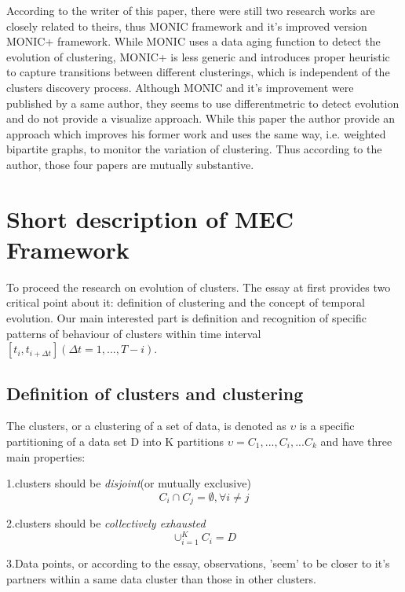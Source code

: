 \documentclass{sig-alternate-05-2015}
\begin{document}
According to the writer of this paper, there were still two research works are closely related to theirs, thus MONIC framework\cite{SPILIOPOULOU:transition} and it's improved version MONIC+ framework\cite{SPILIOPOULOU:tracing}. While MONIC uses a data aging function to detect the evolution of clustering, MONIC+ is less generic and introduces proper heuristic to capture transitions between different clusterings, which is independent of the clusters discovery process. Although MONIC and it's improvement were published by a same author, they seems to use differentmetric to detect evolution and do not provide a visualize approach. While this paper the author provide an approach which improves his former work\cite{OLIVEIRA:bipartite} and uses the same way, i.e. weighted bipartite graphs, to monitor the variation of clustering. Thus according to the author, those four papers are mutually substantive.

\section{Short description of MEC Framework}
To proceed the research on evolution of clusters. The essay at first provides two critical point about it: definition of clustering and the concept of temporal evolution. Our main interested part is definition and recognition of specific patterns of behaviour of clusters within time interval $[t_i, t_{i+\Delta t}] (\Delta t = 1,...,T-i)$.
\subsection{Definition of clusters and clustering}
The clusters, or a clustering of a set of data, is denoted as $\upsilon$ is a specific partitioning of a data set D into K partitions $\upsilon = {C_1,...,C_i,...C_k}$ and have three main properties:

    1.clusters should be \emph{disjoint}(or mutually exclusive)
        \begin{displaymath}
          C_i\cap C_j = \emptyset, \forall i\ne j
        \end{displaymath}

    2.clusters should be \emph{collectively exhausted}
        \begin{displaymath}
          \cup^K_{i=1}C_i=D
        \end{displaymath}

    3.Data points, or according to the essay, observations, 'seem' to be closer to it's partners within a same data cluster than those in other clusters.
\end{document}
